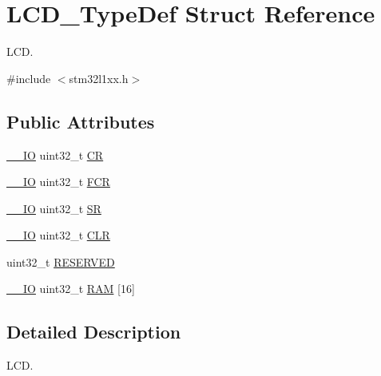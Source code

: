 \hypertarget{struct_l_c_d___type_def}{\section{L\-C\-D\-\_\-\-Type\-Def Struct Reference}
\label{struct_l_c_d___type_def}
}


L\-C\-D.  




{\ttfamily \#include $<$stm32l1xx.\-h$>$}

\subsection*{Public Attributes}
\begin{DoxyCompactItemize}
\item 
\hyperlink{group___c_m_s_i_s__core__definitions_gaec43007d9998a0a0e01faede4133d6be}{\-\_\-\-\_\-\-I\-O} uint32\-\_\-t \hyperlink{struct_l_c_d___type_def_a10f3d5e534f8a6f59a2dcf9d897fba22}{C\-R}
\item 
\hyperlink{group___c_m_s_i_s__core__definitions_gaec43007d9998a0a0e01faede4133d6be}{\-\_\-\-\_\-\-I\-O} uint32\-\_\-t \hyperlink{struct_l_c_d___type_def_a3caccc4b0b894d7b27ed5a4d508154ea}{F\-C\-R}
\item 
\hyperlink{group___c_m_s_i_s__core__definitions_gaec43007d9998a0a0e01faede4133d6be}{\-\_\-\-\_\-\-I\-O} uint32\-\_\-t \hyperlink{struct_l_c_d___type_def_ad54495b57709dac1909e1f90d147606b}{S\-R}
\item 
\hyperlink{group___c_m_s_i_s__core__definitions_gaec43007d9998a0a0e01faede4133d6be}{\-\_\-\-\_\-\-I\-O} uint32\-\_\-t \hyperlink{struct_l_c_d___type_def_a426998a4ef847067fbc78606e2464e4b}{C\-L\-R}
\item 
uint32\-\_\-t \hyperlink{struct_l_c_d___type_def_a556dfa8484476079c2ab593766754d02}{R\-E\-S\-E\-R\-V\-E\-D}
\item 
\hyperlink{group___c_m_s_i_s__core__definitions_gaec43007d9998a0a0e01faede4133d6be}{\-\_\-\-\_\-\-I\-O} uint32\-\_\-t \hyperlink{struct_l_c_d___type_def_adc6718425566b14d2201d6623b91dee4}{R\-A\-M} \mbox{[}16\mbox{]}
\end{DoxyCompactItemize}


\subsection{Detailed Description}
L\-C\-D. 

